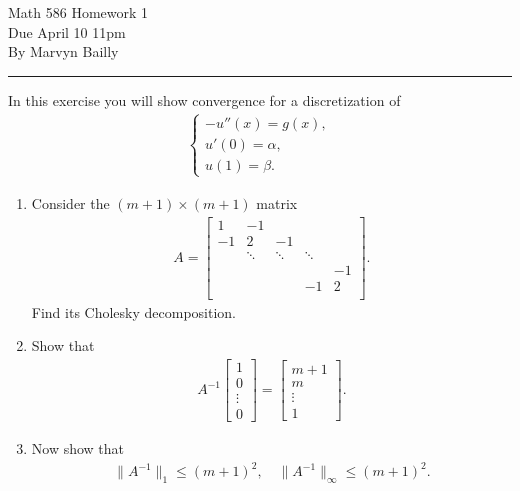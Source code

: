 \documentclass[12pt]{report}
\begin{document}
\large

\begin{center}
 Math 586 Homework 1\\
 Due April 10 11pm\\
 By Marvyn Bailly\\
\end{center}

\normalsize

\hrule





\begin{problem}
    In this exercise you will show convergence for a discretization of
  \begin{align*}
    \begin{cases}
      -u''(x) = g(x),\\
      u'(0) = \alpha,\\
      u(1) = \beta.
    \end{cases}
  \end{align*}
  \begin{enumerate}
\item  Consider the $(m+1) \times (m+1)$ matrix
  \begin{align*}
    A = \begin{bmatrix} 1 & -1 \\ -1 & 2 &-1 \\
    & \ddots & \ddots & \ddots \\
    &&&& -1\\
    &&&-1& 2\\
  \end{bmatrix}.
    \end{align*}
    Find its Cholesky decomposition.
  \item Show that
    \begin{align}\label{unit} A^{-1} \begin{bmatrix}  1 \\ 0 \\ \vdots \\ 0 \end{bmatrix} = \begin{bmatrix}  m +1 \\ m \\ \vdots \\ 1 \end{bmatrix}.\end{align}
  \item Now show that
    \begin{align*}
      \|A^{-1}\|_1 \leq (m+1)^2, \quad \|A^{-1}\|_\infty \leq (m+1)^2.
    \end{align*}
  \end{enumerate}
\end{problem}
\end{document}
